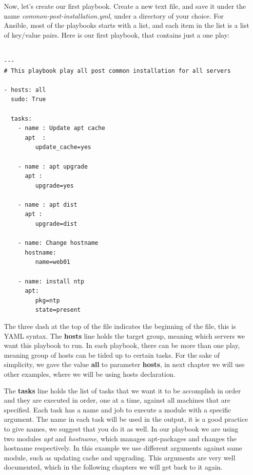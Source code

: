 \documentclass[10pt]{book}
\begin{document}
Now, let's create our first playbook. Create a new text file, and save it under the name 
\emph{common-post-installation.yml}, under a directory of your choice. For 
Ansible, most of the playbooks starts with a list, and each item in the list is a list of key/value 
pairs. Here is our first playbook, that contains just a one play:

\vspace{10 mm}
 
\begin{Verbatim} 
 
---
# This playbook play all post common installation for all servers

- hosts: all
  sudo: True

  tasks:
    - name : Update apt cache
      apt  : 
         update_cache=yes

    - name : apt upgrade
      apt : 
         upgrade=yes

    - name : apt dist
      apt : 
         upgrade=dist

    - name: Change hostname
      hostname: 
         name=web01

    - name: install ntp
      apt:  
         pkg=ntp
         state=present

\end{Verbatim}
 
The three dash at the top of the file indicates the beginning of the file, this is YAML syntax. 
The {\bf hosts} line holds the target group, meaning which servers we want this playbook to run.
In each playbook, there can be more than one play, meaning group of hosts can be tided up to certain 
tasks. For the sake of simplicity, we gave the value {\bf all} to parameter {\bf hosts}, 
in next chapter we will use other examples, where we will be using hosts declaration.

The {\bf tasks} line holds the list of tasks that we want it to be accomplish 
in order and they are executed in order, one at a time, 
against all machines that are specified. Each task has a 
name and job to execute a module with a specific argument. 
The name in each task will be used in the output, it is a good 
practice to give names, we suggest that you do it as well. In our playbook we 
are using two modules \emph{apt} and \emph{hostname}, which manages apt-packages 
and changes the hostname respectively. In this example we use different 
arguments against same module, such as updating cache and upgrading. This 
arguments are very well documented, which in the following chapters we will get 
back to it again. 
\end{document}
